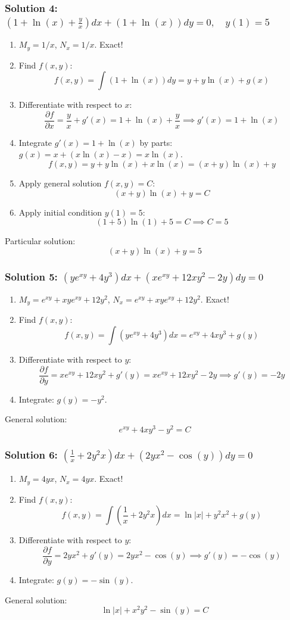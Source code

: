 \documentclass[11pt,letterpaper]{article}
\begin{document}
\subsubsection*{Solution 4: $\left(1 + \ln(x) + \frac{y}{x}\right)dx + \left(1 + \ln(x)\right)dy = 0, \quad y(1) = 5$}
\begin{enumerate}
    \item $M_y = 1/x$, $N_x = 1/x$. Exact!
    \item Find $f(x,y)$:
    \[ f(x,y) = \int (1 + \ln(x)) dy = y + y\ln(x) + g(x) \]
    \item Differentiate with respect to $x$:
    \[ \frac{\partial f}{\partial x} = \frac{y}{x} + g'(x) = 1 + \ln(x) + \frac{y}{x} \implies g'(x) = 1 + \ln(x) \]
    \item Integrate $g'(x) = 1 + \ln(x)$ by parts: $g(x) = x + (x\ln(x) - x) = x\ln(x)$.
    \[ f(x,y) = y + y\ln(x) + x\ln(x) = (x+y)\ln(x) + y \]
    \item Apply general solution $f(x,y) = C$:
    \[ (x+y)\ln(x) + y = C \]
    \item Apply initial condition $y(1) = 5$:
    \[ (1+5)\ln(1) + 5 = C \implies C = 5 \]
\end{enumerate}
Particular solution:
\[ (x+y)\ln(x) + y = 5 \]

\subsubsection*{Solution 5: $\left(y e^{xy} + 4y^3\right)dx + \left(x e^{xy} + 12xy^2 - 2y\right)dy = 0$}
\begin{enumerate}
    \item $M_y = e^{xy} + xy e^{xy} + 12y^2$, $N_x = e^{xy} + xy e^{xy} + 12y^2$. Exact!
    \item Find $f(x,y)$:
    \[ f(x,y) = \int \left(y e^{xy} + 4y^3\right) dx = e^{xy} + 4xy^3 + g(y) \]
    \item Differentiate with respect to $y$:
    \[ \frac{\partial f}{\partial y} = x e^{xy} + 12xy^2 + g'(y) = x e^{xy} + 12xy^2 - 2y \implies g'(y) = -2y \]
    \item Integrate: $g(y) = -y^2$.
\end{enumerate}
General solution:
\[ e^{xy} + 4xy^3 - y^2 = C \]

\subsubsection*{Solution 6: $\left(\frac{1}{x} + 2y^2 x\right)dx + \left(2y x^2 - \cos(y)\right)dy = 0$}
\begin{enumerate}
    \item $M_y = 4yx$, $N_x = 4yx$. Exact!
    \item Find $f(x,y)$:
    \[ f(x,y) = \int \left(\frac{1}{x} + 2y^2 x\right)dx = \ln|x| + y^2 x^2 + g(y) \]
    \item Differentiate with respect to $y$:
    \[ \frac{\partial f}{\partial y} = 2y x^2 + g'(y) = 2y x^2 - \cos(y) \implies g'(y) = -\cos(y) \]
    \item Integrate: $g(y) = -\sin(y)$.
\end{enumerate}
General solution:
\[ \ln|x| + x^2 y^2 - \sin(y) = C \]
\end{document}
